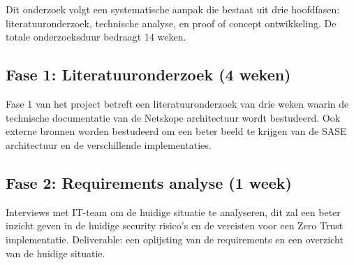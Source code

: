 
\chapter{}%
\label{ch:methodologie}


Dit onderzoek volgt een systematische aanpak die bestaat uit drie hoofdfasen: literatuuronderzoek, technische analyse, en proof of concept ontwikkeling. De totale onderzoeksduur bedraagt 14 weken.

\section{Fase 1: Literatuuronderzoek (4 weken)}
Fase 1 van het project betreft een literatuuronderzoek van drie weken waarin de technische documentatie van de Netskope architectuur wordt bestudeerd. Ook externe bronnen worden bestudeerd om een beter beeld te krijgen van de SASE architectuur en de verschillende implementaties.

\section{Fase 2: Requirements analyse (1 week)}
Interviews met IT-team om de huidige situatie te analyseren, dit zal een beter inzicht geven in de huidige security risico's en de vereisten voor een Zero Trust implementatie. Deliverable: een oplijsting van de requirements en een
overzicht van de huidige situatie.

